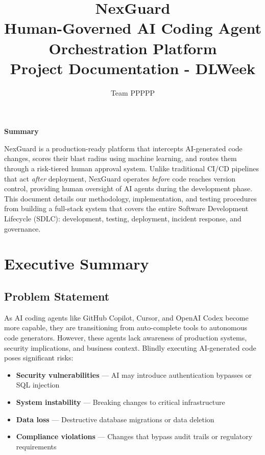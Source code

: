 \documentclass[11pt,a4paper]{article}
\title{
    \Huge\textbf{NexGuard} \\ 
    \vspace{0.5cm}
    \Large Human-Governed AI Coding Agent Orchestration Platform \\
    \vspace{0.5cm}
    \large Project Documentation - DLWeek
}
\author{Team PPPPP}
\date{}
\begin{document}
\maketitle
\thispagestyle{empty}

\vspace{0.5cm}
\begin{center}
\Large\textbf{Summary}
\end{center}
\vspace{0.3cm}

\noindent NexGuard is a production-ready platform that intercepts AI-generated code changes, scores their blast radius using machine learning, and routes them through a risk-tiered human approval system. Unlike traditional CI/CD pipelines that act \textit{after} deployment, NexGuard operates \textit{before} code reaches version control, providing human oversight of AI agents during the development phase. This document details our methodology, implementation, and testing procedures from building a full-stack system that covers the entire Software Development Lifecycle (SDLC): development, testing, deployment, incident response, and governance.

\vspace{0.5cm}

\newpage
\tableofcontents
\newpage

\section{Executive Summary}

\subsection{Problem Statement}
As AI coding agents like GitHub Copilot, Cursor, and OpenAI Codex become more capable, they are transitioning from auto-complete tools to autonomous code generators. However, these agents lack awareness of production systems, security implications, and business context. Blindly executing AI-generated code poses significant risks:

\begin{itemize}[leftmargin=*]
    \item \textbf{Security vulnerabilities} --- AI may introduce authentication bypasses or SQL injection
    \item \textbf{System instability} --- Breaking changes to critical infrastructure
    \item \textbf{Data loss} --- Destructive database migrations or data deletion
    \item \textbf{Compliance violations} --- Changes that bypass audit trails or regulatory requirements
\end{itemize}
\end{document}
